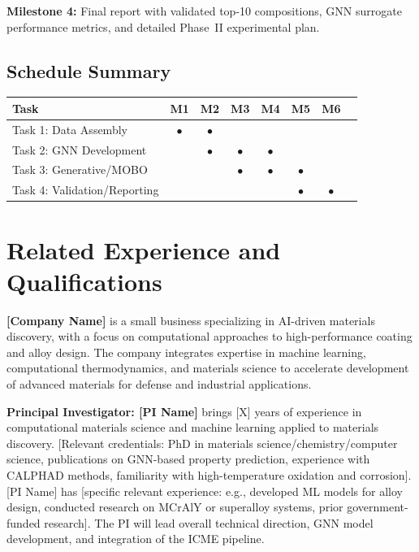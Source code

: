 \documentclass[11pt,letterpaper]{article}
\begin{document}
\textbf{Milestone 4:} Final report with validated top-10 compositions, GNN surrogate performance metrics, and detailed Phase~II experimental plan.

\subsection{Schedule Summary}

\begin{center}
\begin{tabular}{lccccccc}
\toprule
\textbf{Task} & \textbf{M1} & \textbf{M2} & \textbf{M3} & \textbf{M4} & \textbf{M5} & \textbf{M6} \\
\midrule
Task 1: Data Assembly & $\bullet$ & $\bullet$ & & & & \\
Task 2: GNN Development & & $\bullet$ & $\bullet$ & $\bullet$ & & \\
Task 3: Generative/MOBO & & & $\bullet$ & $\bullet$ & $\bullet$ & \\
Task 4: Validation/Reporting & & & & & $\bullet$ & $\bullet$ \\
\bottomrule
\end{tabular}
\end{center}


\section{Related Experience and Qualifications}
\label{sec:qualifications}

\textbf{[Company Name]} is a small business specializing in AI-driven materials discovery, with a focus on computational approaches to high-performance coating and alloy design. The company integrates expertise in machine learning, computational thermodynamics, and materials science to accelerate development of advanced materials for defense and industrial applications.

\textbf{Principal Investigator: [PI Name]} brings [X] years of experience in computational materials science and machine learning applied to materials discovery. [Relevant credentials: PhD in materials science/chemistry/computer science, publications on GNN-based property prediction, experience with CALPHAD methods, familiarity with high-temperature oxidation and corrosion]. [PI Name] has [specific relevant experience: e.g., developed ML models for alloy design, conducted research on MCrAlY or superalloy systems, prior government-funded research]. The PI will lead overall technical direction, GNN model development, and integration of the ICME pipeline.
\end{document}
